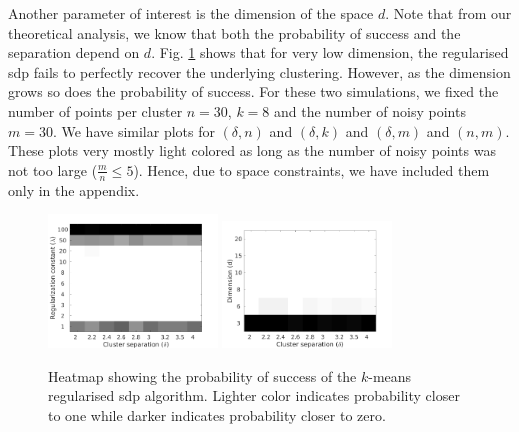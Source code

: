 \documentclass[12pt]{article}
\begin{document}
Another parameter of interest is the dimension of the space $d$. Note that from our theoretical analysis, we know that both the probability of success and the separation depend on $d$. Fig. \ref{figure:simulation} shows that for very low dimension, the regularised sdp fails to perfectly recover the underlying clustering. However, as the dimension grows so does the probability of success. For these two simulations, we fixed the number of points per cluster $n = 30$, $k = 8$ and the number of noisy points $m = 30$. We have similar plots for $(\delta, n)$ and $(\delta, k)$ and $(\delta, m)$ and $(n, m)$. These plots very mostly light colored as long as the number of noisy points was not too large ($\frac{m}{n} \le 5$). Hence, due to space constraints, we have included them only in the appendix.
   
\begin{figure}[t]
  \centering
  \includegraphics[width=0.4\textwidth]{figures/optimizationClustering/deltaLambda.png}
  \includegraphics[width=0.4\textwidth]{figures/optimizationClustering/deltaD.png}
  \caption{Heatmap showing the probability of success of the $k$-means regularised sdp algorithm. Lighter color indicates probability closer to one while darker indicates probability closer to zero.}  
  \label{figure:simulation}
\end{figure}
\end{document}
